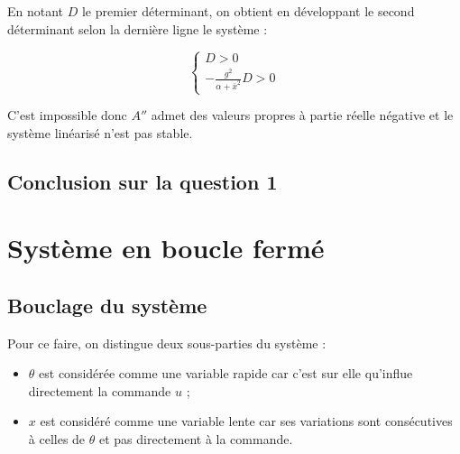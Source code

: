 \documentclass[10pt]{article}
\begin{document}
\vspace{10px}

\noindent En notant $D$ le premier déterminant, on obtient en développant le second déterminant selon la dernière
ligne le système :

\[
	\begin{cases}
		D > 0 \\
		- \frac{g^2}{\alpha + \bar x^2} D > 0
	\end{cases}
\]

\newpage

\noindent C'est impossible donc $A''$ admet des valeurs propres à partie réelle négative et le système linéarisé n'est
pas stable.

\subsection*{Conclusion sur la question 1}


\section{Système en boucle fermé}

\newcommand{\kt}{k_{\theta}}
\newcommand{\kdx}{k^d_x}
\newcommand{\kdt}{k^d_{\theta}}
\newcommand{\fact}[1]{\frac{g #1 }{\alpha + \bar x^2}} %

\subsection*{Bouclage du système}

\noindent Pour ce faire, on distingue deux sous-parties du système :

\begin{itemize}
	\item $\theta$ est considérée comme une variable rapide car c'est sur elle qu'influe directement la commande $u$ ;
	\item $x$ est considéré comme une variable lente car ses variations sont consécutives à celles de $\theta$ et
	pas directement à la commande.
\end{itemize}
\end{document}

